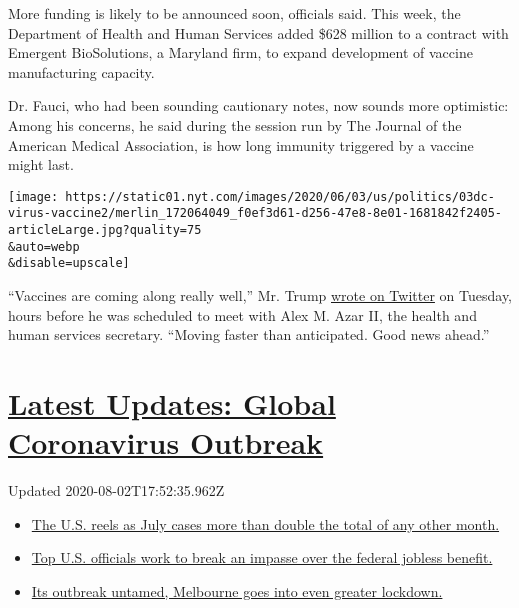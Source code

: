 More funding is likely to be announced soon, officials said. This week,
the Department of Health and Human Services added \$628 million to a
contract with Emergent BioSolutions, a Maryland firm, to expand
development of vaccine manufacturing capacity.

Dr. Fauci, who had been sounding cautionary notes, now sounds more
optimistic: Among his concerns, he said during the session run by The
Journal of the American Medical Association, is how long immunity
triggered by a vaccine might last.

\texttt{[image: https://static01.nyt.com/images/2020/06/03/us/politics/03dc-virus-vaccine2/merlin\_172064049\_f0ef3d61-d256-47e8-8e01-1681842f2405-articleLarge.jpg?quality=75\\\&auto=webp\\\&disable=upscale]}

``Vaccines are coming along really well,'' Mr. Trump
\href{https://twitter.com/realDonaldTrump/status/1267826457796984832}{wrote
on Twitter} on Tuesday, hours before he was scheduled to meet with Alex
M. Azar II, the health and human services secretary. ``Moving faster
than anticipated. Good news ahead.''

\hypertarget{latest-updates-global-coronavirus-outbreak}{%
\section{\texorpdfstring{\href{https://www.nytimes.com/2020/08/01/world/coronavirus-covid-19.html?action=click\&pgtype=Article\&state=default\&region=MAIN_CONTENT_1\&context=storylines_live_updates}{Latest
Updates: Global Coronavirus
Outbreak}}{Latest Updates: Global Coronavirus Outbreak}}\label{latest-updates-global-coronavirus-outbreak}}

Updated 2020-08-02T17:52:35.962Z

\begin{itemize}
\tightlist
\item
  \href{https://www.nytimes.com/2020/08/01/world/coronavirus-covid-19.html?action=click\&pgtype=Article\&state=default\&region=MAIN_CONTENT_1\&context=storylines_live_updates\#link-34047410}{The
  U.S. reels as July cases more than double the total of any other
  month.}
\item
  \href{https://www.nytimes.com/2020/08/01/world/coronavirus-covid-19.html?action=click\&pgtype=Article\&state=default\&region=MAIN_CONTENT_1\&context=storylines_live_updates\#link-780ec966}{Top
  U.S. officials work to break an impasse over the federal jobless
  benefit.}
\item
  \href{https://www.nytimes.com/2020/08/01/world/coronavirus-covid-19.html?action=click\&pgtype=Article\&state=default\&region=MAIN_CONTENT_1\&context=storylines_live_updates\#link-2bc8948}{Its
  outbreak untamed, Melbourne goes into even greater lockdown.}
\end{itemize}

